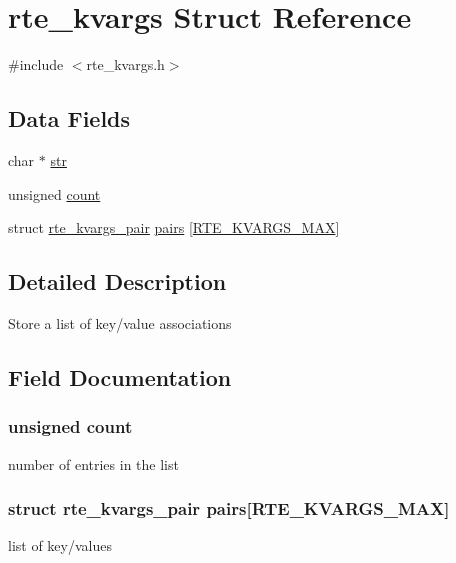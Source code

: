 \hypertarget{structrte__kvargs}{}\section{rte\+\_\+kvargs Struct Reference}
\label{structrte__kvargs}


{\ttfamily \#include $<$rte\+\_\+kvargs.\+h$>$}

\subsection*{Data Fields}
\begin{DoxyCompactItemize}
\item 
char $\ast$ \hyperlink{structrte__kvargs_ab50d783982593ef993ea0b68f7ad8b80}{str}
\item 
unsigned \hyperlink{structrte__kvargs_a6a9e89d63eb610dfe238b0a840979421}{count}
\item 
struct \hyperlink{structrte__kvargs__pair}{rte\+\_\+kvargs\+\_\+pair} \hyperlink{structrte__kvargs_ac95dbf1ad698b4837346bee39cf35875}{pairs} \mbox{[}\hyperlink{rte__kvargs_8h_a9124881bdfe920f08f642a3c1f230530}{R\+T\+E\+\_\+\+K\+V\+A\+R\+G\+S\+\_\+\+M\+A\+X}\mbox{]}
\end{DoxyCompactItemize}


\subsection{Detailed Description}
Store a list of key/value associations 

\subsection{Field Documentation}
\hypertarget{structrte__kvargs_a6a9e89d63eb610dfe238b0a840979421}{}
\subsubsection[{count}]{\setlength{\rightskip}{0pt plus 5cm}unsigned count}\label{structrte__kvargs_a6a9e89d63eb610dfe238b0a840979421}
number of entries in the list \hypertarget{structrte__kvargs_ac95dbf1ad698b4837346bee39cf35875}{}
\subsubsection[{pairs}]{\setlength{\rightskip}{0pt plus 5cm}struct {\bf rte\+\_\+kvargs\+\_\+pair} pairs\mbox{[}{\bf R\+T\+E\+\_\+\+K\+V\+A\+R\+G\+S\+\_\+\+M\+A\+X}\mbox{]}}\label{structrte__kvargs_ac95dbf1ad698b4837346bee39cf35875}
list of key/values \hypertarget{structrte__kvargs_ab50d783982593ef993ea0b68f7ad8b80}{}
